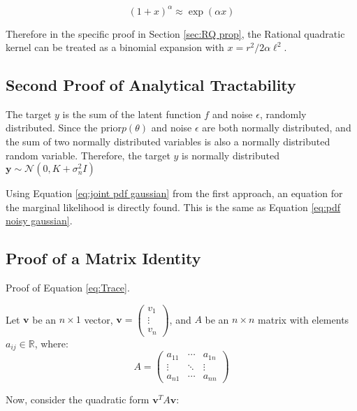 \documentclass[12pt,a4paper]{article}
\begin{document}
\begin{equation}
(1 + x)^\alpha \approx \exp(\alpha x)
\label{eq:binomial approx}
\end{equation}

Therefore in the specific proof in Section \ref{sec:RQ prop}, the Rational quadratic kernel can be treated as a binomial expansion with \(x= r^2/2 \alpha \ell^2\).

\subsection{Second Proof of Analytical Tractability}
\label{sec:second proof to analytical tractability}

The target \(y\) is the sum of the latent function \(f\) and noise \(\epsilon\), randomly distributed. Since the prior\(p(\theta)\) and noise \(\epsilon\) are both normally distributed, and the sum of two normally distributed variables is also a normally distributed random variable. Therefore, the target \(y\) is normally distributed \(\mathbf{y} \sim \mathcal{N}(0, K + \sigma_n^2 I)\)

Using Equation \eqref{eq:joint pdf gaussian} from the first approach, an equation for the marginal likelihood is directly found. This is the same as Equation \eqref{eq:pdf noisy gaussian}.

\subsection{Proof of a Matrix Identity}
\label{sec:proof of trace}

Proof of Equation \eqref{eq:Trace}.

Let \( \mathbf{v} \) be an \( n \times 1 \) vector, \( \mathbf{v} = \begin{pmatrix} v_1 \\ \vdots \\ v_n \end{pmatrix} \), and \( A \) be an \( n \times n \) matrix with elements \( a_{ij} \in \mathbb{R} \), where:
\[
A = \begin{pmatrix} a_{11} & \cdots & a_{1n} \\
\vdots & \ddots & \vdots \\
a_{n1} & \cdots & a_{nn} \end{pmatrix}
\]

Now, consider the quadratic form \( \mathbf{v}^T A \mathbf{v} \):
\end{document}
